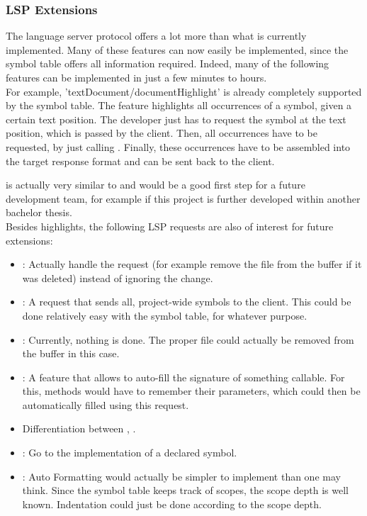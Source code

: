 \subsubsection{LSP Extensions}
The language server protocol \cite{lspspec} offers a lot more than what is currently implemented.
Many of these features can now easily be implemented, since the symbol table offers all information required.
Indeed, many of the following features can be implemented in just a few minutes to hours.\\

For example, 'textDocument/documentHighlight' \cite{lspspec} is already completely supported by the symbol table.
The feature highlights all occurrences of a symbol, given a certain text position.
The developer just has to request the symbol at the text position, which is passed by the client.
Then, all occurrences have to be requested, by just calling .
Finally, these occurrences have to be assembled into the target response format  and can be sent back to the client.

 is actually very similar to  and would be a good first step for a future development team,
for example if this project is further developed within another bachelor thesis.\\

Besides highlights, the following LSP requests are also of interest for future extensions:
\begin{itemize}
    \item {}: Actually handle the request (for example remove the file from the buffer if it was deleted) instead of ignoring the change.
    \item {}: A request that sends all, project-wide symbols to the client. This could be done relatively easy with the symbol table, for whatever purpose.
    \item {}: Currently, nothing is done. The proper file could actually be removed from the buffer in this case.
    \item {}: A feature that allows to auto-fill the signature of something callable. For this, methods would have to remember their parameters, which could then be automatically filled using this request.
    \item Differentiation between , .
    \item {}: Go to the implementation of a declared symbol.
    \item {}: Auto Formatting would actually be simpler to implement than one may think. Since the symbol table keeps track of scopes, the scope depth is well known. Indentation could just be done according to the scope depth.
\end{itemize}

